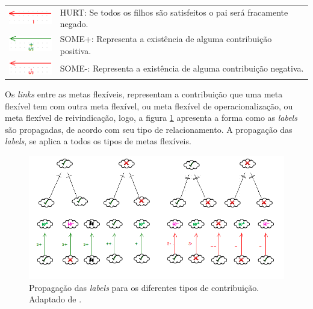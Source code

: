 \begin{table}[h!]
\begin{tabular}{|l|l|}
		\multirow{2}{*}{\includegraphics[scale=0.9]{figuras/Hurt.png}} & \multirow{2}{*}{HURT: Se todos os filhos são satisfeitos o pai será fracamente negado.} \\
		&  \\ \hline
		\multirow{2}{*}{\includegraphics[scale=0.9]{figuras/SomeMais.png}} & \multirow{2}{*}{SOME+: Representa a existência de alguma contribuição positiva.} \\
		&  \\ \hline
		\multirow{2}{*}{\includegraphics[scale=0.9]{figuras/SomeMenos.png}} & \multirow{2}{*}{SOME-: Representa a existência de alguma contribuição negativa.} \\
		&  \\ \hline
	\end{tabular}
\end{table}

\pagebreak

Os \textit{links} entre as metas flexíveis, representam a contribuição que uma meta flexível tem com outra meta flexível, ou meta flexível de operacionalização, ou meta flexível de reivindicação, logo, a figura \ref{catalogoDeAvaliação} apresenta a forma como as \textit{labels} são propagadas, de acordo com seu tipo de relacionamento. A propagação das \textit{labels}, se aplica a todos os tipos de metas flexíveis. 

\begin{figure}[h!]
	\centering
	\includegraphics[keepaspectratio=true,scale=0.8]{figuras/catalogoDeAvaliacao.png}
	\caption{Propagação das \textit{labels} para os diferentes tipos de contribuição. Adaptado de \cite{chung2012non}.}
	\label{catalogoDeAvaliação}
\end{figure} 

